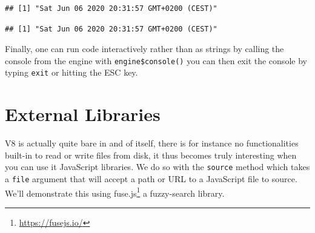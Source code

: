 \documentclass[
]{krantz}
\makeatletter
\newenvironment{Shaded}{\begin{snugshade}}{\end{snugshade}}
\newcommand{\CommentTok}[1]{\textcolor[rgb]{0.37,0.37,0.37}{\textit{#1}}}
\newcommand{\KeywordTok}[1]{\textcolor[rgb]{0.27,0.27,0.27}{\textbf{#1}}}
\newcommand{\NormalTok}[1]{#1}
\newcommand{\OperatorTok}[1]{\textcolor[rgb]{0.43,0.43,0.43}{\textbf{#1}}}
\newcommand{\StringTok}[1]{\textcolor[rgb]{0.5,0.5,0.5}{#1}}
\renewcommand{\href}[2]{#2\footnote{\url{#1}}}
\newenvironment{kframe}{%
\medskip{}
\setlength{\fboxsep}{.8em}
 \def\at@end@of@kframe{}%
 \ifinner\ifhmode%
  \def\at@end@of@kframe{\end{minipage}}%
  \begin{minipage}{\columnwidth}%
 \fi\fi%
 \def\FrameCommand##1{\hskip\@totalleftmargin \hskip-\fboxsep
 \colorbox{shadecolor}{##1}\hskip-\fboxsep
     \hskip-\linewidth \hskip-\@totalleftmargin \hskip\columnwidth}%
 \MakeFramed {\advance\hsize-\width
   \@totalleftmargin\z@ \linewidth\hsize
   \@setminipage}}%
 {\par\unskip\endMakeFramed%
 \at@end@of@kframe}
\renewenvironment{Shaded}{\begin{kframe}}{\end{kframe}}
\makeatother
\begin{document}
\begin{Shaded}
\end{Shaded}

\begin{verbatim}
## [1] "Sat Jun 06 2020 20:31:57 GMT+0200 (CEST)"
\end{verbatim}

\begin{Shaded}
\end{Shaded}

\begin{verbatim}
## [1] "Sat Jun 06 2020 20:31:57 GMT+0200 (CEST)"
\end{verbatim}

Finally, one can run code interactively rather than as strings by calling the console from the engine with \texttt{engine\$console()} you can then exit the console by typing \texttt{exit} or hitting the ESC key.

\hypertarget{external-libraries}{%
\section*{External Libraries}\label{external-libraries}}


V8 is actually quite bare in and of itself, there is for instance no functionalities built-in to read or write files from disk, it thus becomes truly interesting when you can use it JavaScript libraries. We do so with the \texttt{source} method which takes a \texttt{file} argument that will accept a path or URL to a JavaScript file to source. We'll demonstrate this using \href{https://fusejs.io/}{fuse.js} a fuzzy-search library.

\begin{Shaded}
\end{Shaded}
\end{document}
